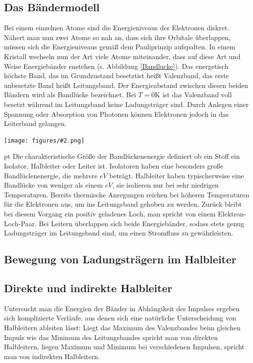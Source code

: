 \documentclass[12pt]{article}
\newcommand{\gra}[3][0.7]{
	\begin{minipage}[h!]{\textwidth}
		\centering
		\texttt{[image: figures/\#2.png]}
		\captionof{figure}{#3}
	\end{minipage}
	\vskip 30 pt
	}
\begin{document}
\subsection{Das Bändermodell}

Bei einem einzelnen Atome sind die Energieniveaus der Elektronen diskret. Nähert man nun zwei Atome so nah an, dass sich ihre Orbitale überlappen, müssen sich die Energieniveaus gemäß dem Pauliprinzip aufspalten. In einem Kristall wechseln nun der Art viele Atome miteinander, dass auf diese Art und Weise Energiebänder enstehen (s. Abbildung \ref{Bandlucke}). Das energetisch höchste Band, das im Grundzustand besetztist heißt Valenzband, das erste unbesetzte Band heißt Leitungsband. Der Energieabstand zwischen diesen beiden Bändern wird als Bandlücke bezeichnet. Bei $T = 0$K ist das Valenzband voll besetzt während im Leitungsband keine Ladungsträger sind. Durch Anlegen einer Spannung oder Absorption von Photonen können Elektronen jedoch in das Leiterband gelangen. 

\gra{Bandlucke}{Bändermodell des Halbleiters \label{Bandlucke}} \cite{staat}
Die charakteristische Größe der Bandlückenenergie definiert ob ein Stoff ein Isolator, Halbleiter oder Leiter ist. Isolatoren haben eine besonders große Bandlüclenenergie, die mehrere $eV$ beträgt. Halbleiter haben typischerweise eine Bandlücke von weniger als einem $eV$, sie isolieren nur bei sehr niedrigen Temperaturen. Bereits thermische Anregungen reichen bei höheren Temperaturen für die Elektronen aus, um ins Leitungsband gehoben zu werden, Zurück bleibt bei diesem Vorgang ein positiv geladenes Loch, man spricht von einem Elektron-Loch-Paar. Bei Leitern überlappen sich beide Energiebänder, sodass stets genug Ladungsträger im Leitungsband sind, um einen Stromfluss zu gewährleisten.

\subsection{Bewegung von Ladungsträgern im Halbleiter}



\subsection{Direkte und indirekte Halbleiter}

Untersucht man die Energien der Bänder in Abhängikeit des Impulses ergeben sich komplizierte Verläufe, aus denen sich eine natürliche Unterscheidung von Halbleitern ableiten lässt: Liegt das Maximum des Valenzbandes beim gleichen Impuls wie das Minimum des Leitungsbandes spricht man von direkten Halbleitern, liegen Maximum und Minimum bei verschiedenen Impulsen, spricht man von indirekten Halbleitern.
\end{document}
